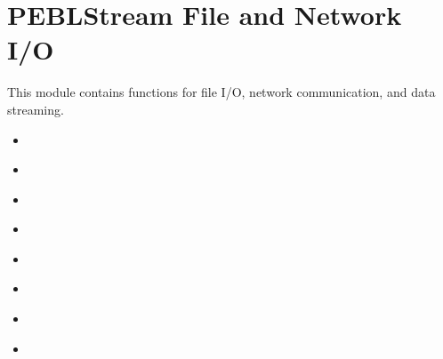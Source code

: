 \documentclass[letterpaper,10pt,english]{sphinxmanual}
\begin{document}
\section{PEBLStream \sphinxhyphen{} File and Network I/O}
\label{\detokenize{reference/peblstream:peblstream-file-and-network-i-o}}\label{\detokenize{reference/peblstream::doc}}
\sphinxAtStartPar
This module contains functions for file I/O, network communication, and data streaming.

\begin{sphinxShadowBox}
\begin{itemize}
\item {} 
\sphinxAtStartPar
{}\label{\detokenize{reference/peblstream:id1}}{\hyperref[\detokenize{reference/peblstream:appendfile}]{}}

\item {} 
\sphinxAtStartPar
{}\label{\detokenize{reference/peblstream:id2}}{\hyperref[\detokenize{reference/peblstream:acceptnetworkconnection}]{}}

\item {} 
\sphinxAtStartPar
{}\label{\detokenize{reference/peblstream:id3}}{\hyperref[\detokenize{reference/peblstream:checkfornetworkconnection}]{}}

\item {} 
\sphinxAtStartPar
{}\label{\detokenize{reference/peblstream:id4}}{\hyperref[\detokenize{reference/peblstream:closenetworkconnection}]{}}

\item {} 
\sphinxAtStartPar
{}\label{\detokenize{reference/peblstream:id5}}{\hyperref[\detokenize{reference/peblstream:connecttohost}]{}}

\item {} 
\sphinxAtStartPar
{}\label{\detokenize{reference/peblstream:id6}}{\hyperref[\detokenize{reference/peblstream:connecttoip}]{}}

\item {} 
\sphinxAtStartPar
{}\label{\detokenize{reference/peblstream:id7}}{\hyperref[\detokenize{reference/peblstream:copyfile}]{}}

\item {} 
\sphinxAtStartPar
{}\label{\detokenize{reference/peblstream:id8}}{\hyperref[\detokenize{reference/peblstream:endoffile}]{}}


\end{itemize}
\end{sphinxShadowBox}
\end{document}
